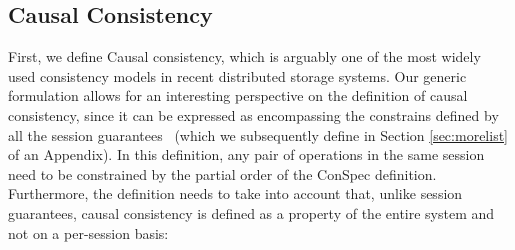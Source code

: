 \documentclass[conference]{IEEEtran}
\begin{document}
	
	\subsection{Causal Consistency}
	
	
	First, we define Causal consistency, which is arguably one of the most widely used consistency models in recent distributed storage systems. Our generic formulation allows for an interesting perspective on the definition of causal consistency, since it can be expressed as encompassing the constrains defined by all the session guarantees~\cite{Ahamad:1993:PPC:165231.165264} (which we subsequently define in Section \ref{sec:morelist} of an Appendix). In this definition, any pair of operations in the same session need to be constrained by the partial order of the ConSpec definition. Furthermore, the definition needs to take into account that, unlike session guarantees, causal consistency is  defined as a property of the entire system and not on a per-session basis:
	
\end{document}
